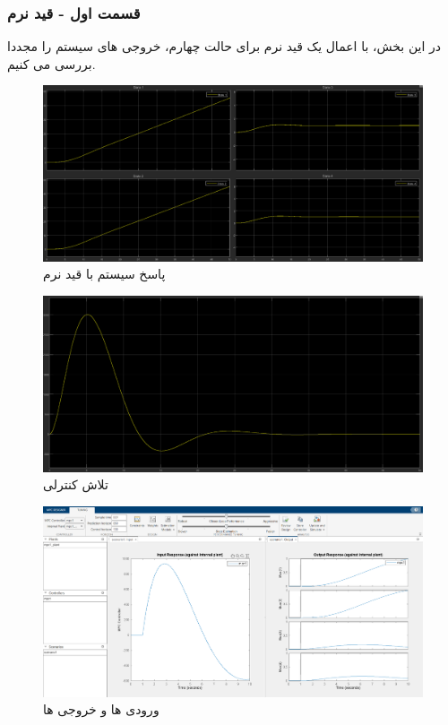 \subsubsection{قسمت اول - قید نرم}
در این بخش، با اعمال یک قید نرم برای حالت چهارم، خروجی های سیستم را مجددا بررسی می کنیم.
\begin{figure}
	\centering
	\includegraphics[width=1\linewidth]{../img/Q2_LMPC_ِsoft_Response}
	\caption{پاسخ سیستم با قید نرم}
	\label{fig:q2lmpcsoftresponse}
\end{figure}
\begin{figure}[H]
	\centering
	\includegraphics[width=1\linewidth]{../img/Q2_LMPC_ِsoft_Ceffort}
	\caption{تلاش کنترلی}
	\label{fig:q2lmpcsoftceffort}
\end{figure}
\begin{figure}[H]
	\centering
	\includegraphics[width=1\linewidth]{../img/Q2_LMPC_ِsoft_setting}
	\caption{ورودی ها و خروجی ها}
	\label{fig:q2lmpcsoftsetting}
\end{figure}
